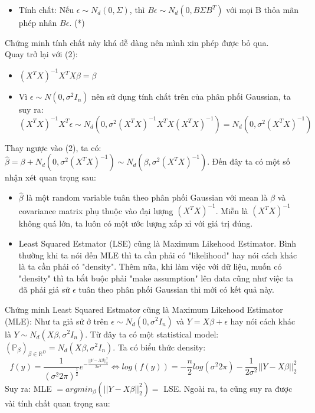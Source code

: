 \documentclass[10pt]{article}
\begin{document}
\begin{enumerate}
\begin{itemize}
\item Tính chất: Nếu $\epsilon \sim N_d(0, \Sigma)$, thì $B\epsilon \sim N_d(0, B\Sigma B^{T})$ với mọi B thỏa mãn phép nhân $B\epsilon $. (*)

\end{itemize}
Chứng minh tính chất này khá dễ dàng nên mình xin phép được bỏ qua.\\
Quay trở lại với (2):
\begin{itemize}

\item $(X^{T}X)^{-1}X^{T}X\beta= \beta$
\item  Vì $\epsilon \sim N(0, \sigma^2 I_n)$ nên sử dụng tính chất trên của phân phối Gaussian, ta suy ra:  
\[ (X^{T}X)^{-1}X^{T}\epsilon \sim N_d(0, \sigma^2 (X^{T}X)^{-1}X^{T} X (X^{T}X)^{-1}) = N_d(0, \sigma^2 (X^{T}X)^{-1})\]

\end{itemize}
Thay ngược vào (2), ta có: $\hat{\beta} = \beta + N_d(0, \sigma^2 (X^{T}X)^{-1}) \sim N_d(\beta, \sigma^2 (X^{T}X)^{-1}).$
Đến đây ta có một số nhận xét quan trọng sau:
\begin{itemize}

\item $\hat{\beta}$ là một random variable tuân theo phân phối Gaussian với mean là $\beta$ và covariance matrix phụ thuộc vào đại lượng $(X^{T}X)^{-1}$. Miễn là $(X^{T}X)^{-1}$ không quá lớn, ta luôn có một ước lượng xấp xỉ với giá trị đúng.
\item  Least Squared Estmator (LSE) cũng là Maximum Likehood Estimator. Bình thường khi ta nói đến MLE thì ta cần phải có "likelihood" hay nói cách khác là ta cần phải có "density". Thêm nữa, khi làm việc với dữ liệu, muốn có "density" thì ta bắt buộc phải "make assumption" lên data cũng như việc ta đã phải giả sử $\epsilon$ tuân theo phân phối Gaussian thì mới có kết quả này.

\end{itemize}
Chứng minh Least Squared Estmator cũng là Maximum Likehood Estimator (MLE): Như ta giả sử ở trên $\epsilon \sim N_d(0, \sigma^2 I_n)$ và $Y = X\beta + \epsilon$ hay nói cách khác là $Y \sim N_d(X\beta, \sigma^2 I_n)$. Từ đây ta có một statistical model: $(\mathbb{P}_{\beta})_{\beta \in \mathbb{R}^{D}} = {N_d(X\beta, \sigma^2 I_n)}$. Ta có biểu thức density:
\[f(y) = \frac{1}{(\sigma^2 2\pi)^{\frac{1}{2}}}e^{-\frac{||Y-X\beta ||^2_2}{2\sigma^2}} \Longleftrightarrow log(f(y))= -\frac{n}{2}log(\sigma^2 2 \pi) -\frac{1}{2\sigma^2}||Y-X\beta ||^2_2 \]
Suy ra: MLE  $=argmin_{\beta}(||Y-X\beta ||^2_2)=$ LSE.
Ngoài ra, ta cũng suy ra được vài tính chất quan trọng sau:
\begin{itemize}


\end{itemize}
\end{enumerate}
\end{document}
